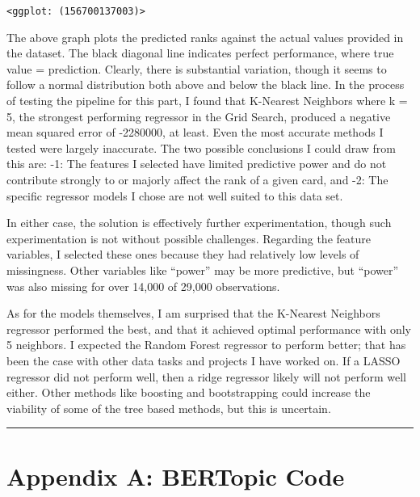 \documentclass[11pt]{article}
\makeatletter
\newcommand{\boxspacing}{\kern\kvtcb@left@rule\kern\kvtcb@boxsep}
\newcommand{\prompt}[4]{
        {\ttfamily\llap{{\color{#2}[#3]:\hspace{3pt}#4}}\vspace{-\baselineskip}}
    }
\makeatother
\begin{document}
            \begin{tcolorbox}[breakable, size=fbox, boxrule=.5pt, pad at break*=1mm, opacityfill=0]
\prompt{Out}{outcolor}{38}{\boxspacing}
\begin{Verbatim}[commandchars=\\\{\}]
<ggplot: (156700137003)>
\end{Verbatim}
\end{tcolorbox}
        
    The above graph plots the predicted ranks against the actual values
provided in the dataset. The black diagonal line indicates perfect
performance, where true value = prediction. Clearly, there is
substantial variation, though it seems to follow a normal distribution
both above and below the black line. In the process of testing the
pipeline for this part, I found that K-Nearest Neighbors where k = 5,
the strongest performing regressor in the Grid Search, produced a
negative mean squared error of -2280000, at least. Even the most
accurate methods I tested were largely inaccurate. The two possible
conclusions I could draw from this are: -1: The features I selected have
limited predictive power and do not contribute strongly to or majorly
affect the rank of a given card, and -2: The specific regressor models I
chose are not well suited to this data set.

In either case, the solution is effectively further experimentation,
though such experimentation is not without possible challenges.
Regarding the feature variables, I selected these ones because they had
relatively low levels of missingness. Other variables like ``power'' may
be more predictive, but ``power'' was also missing for over 14,000 of
29,000 observations.

As for the models themselves, I am surprised that the K-Nearest
Neighbors regressor performed the best, and that it achieved optimal
performance with only 5 neighbors. I expected the Random Forest
regressor to perform better; that has been the case with other data
tasks and projects I have worked on. If a LASSO regressor did not
perform well, then a ridge regressor likely will not perform well
either. Other methods like boosting and bootstrapping could increase the
viability of some of the tree based methods, but this is uncertain.

    \begin{center}\rule{0.5\linewidth}{0.5pt}\end{center}

    \hypertarget{appendix-a-bertopic-code}{%
\section{Appendix A: BERTopic Code}\label{appendix-a-bertopic-code}}
\end{document}

